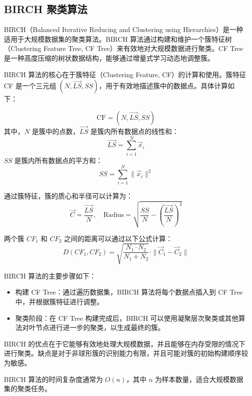 \documentclass{ctexart} %
\begin{document}
\subsection{BIRCH 聚类算法}

BIRCH（Balanced Iterative Reducing and Clustering using Hierarchies）是一种适用于大规模数据集的聚类算法。BIRCH 算法通过构建和维护一个簇特征树（Clustering Feature Tree, CF Tree）来有效地对大规模数据进行聚类。CF Tree 是一种高度压缩的树状数据结构，能够通过增量式学习动态地调整簇。

BIRCH 算法的核心在于簇特征（Clustering Feature, CF）的计算和使用。簇特征 CF 是一个三元组 \((N, \vec{LS}, SS)\)，用于有效地描述簇中的数据点。具体计算如下：

\[
\text{CF} = (N, \vec{LS}, SS)
\]
其中，\(N\) 是簇中的点数，\(\vec{LS}\) 是簇内所有数据点的线性和：
\[
\vec{LS} = \sum_{i=1}^{N} \vec{x}_i
\]
\(SS\) 是簇内所有数据点的平方和：
\[
SS = \sum_{i=1}^{N} \|\vec{x}_i\|^2
\]

通过簇特征，簇的质心和半径可以计算为：
\[
\vec{C} = \frac{\vec{LS}}{N}, \quad \text{Radius} = \sqrt{\frac{SS}{N} - \left(\frac{\vec{LS}}{N}\right)^2}
\]

两个簇 \(CF_1\) 和 \(CF_2\) 之间的距离可以通过以下公式计算：
\[
D(CF_1, CF_2) = \sqrt{\frac{N_1 \cdot N_2}{N_1 + N_2}} \cdot \|\vec{C}_1 - \vec{C}_2\|
\]

BIRCH 算法的主要步骤如下：
\begin{itemize}
    \item 构建 CF Tree：通过遍历数据集，BIRCH 算法将每个数据点插入到 CF Tree 中，并根据簇特征进行调整。
    \item 聚类阶段：在 CF Tree 构建完成后，BIRCH 可以使用凝聚层次聚类或其他算法对叶节点进行进一步的聚类，以生成最终的簇。
\end{itemize}

BIRCH 的优点在于它能够有效地处理大规模数据，并且能够在内存受限的情况下进行聚类。缺点是对于非球形簇的识别能力有限，并且可能对簇的初始构建顺序较为敏感。

BIRCH 算法的时间复杂度通常为 \(O(n)\)，其中 \(n\) 为样本数量，适合大规模数据集的聚类任务。
\end{document}
